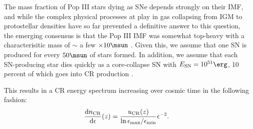  The mass fraction of Pop III stars dying as SNe depends strongly on their IMF, and while the complex physical processes at play in gas collapsing from IGM to protostellar densities have so far prevented a definitive answer to this question, the emerging consensus is that the Pop III IMF was somewhat top-heavy with a characterisitic mass of $\sim$ a few $\times 10\msun$ \citep{Bromm2013}.  Given this, we assume that one SN is produced for every $50\msun$ of stars formed.  In addition, we assume that each SN-producing star dies quickly as a core-collapse SN with $E_{\rm \small SN} = 10^{51}\erg$, 10 percent of which goes into CR production \citep[e.g.,][]{Ruderman1974}.
 
 This results in a CR energy spectrum increasing over cosmic time in the following fashion:
 \begin{equation}
 \frac{{\rm d}n_{\rm \small CR}}{{\rm d}\epsilon}(z) = \frac{u_{\rm \small CR}(z)}{{\rm ln}\,\epsilon_{\rm max}{\large /}\epsilon_{\rm min}}  \epsilon^{-2}.
 \end{equation}